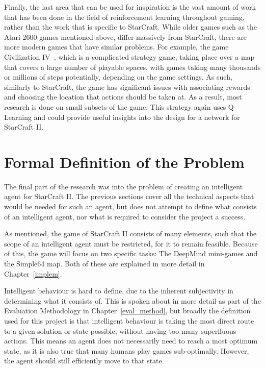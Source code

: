 Finally, the last area that can be used for inspiration is the vast amount of
work that has been done in the field of reinforcement learning throughout gaming,
rather than the work that is specific to StarCraft. While older games such as
the Atari 2600 games mentioned above, differ massively from StarCraft, there are
more modern games that have similar problems. For example, the game
Civilization IV~\cite{wender2008using}, which is a complicated strategy game,
taking place over a map that covers a large number of playable spaces, with
games taking many thousands or millions of steps potentially, depending on the
game settings. As such, similarly to StarCraft, the game has significant issues
with associating rewards and choosing the location that actions should be taken
at. As a result, most research is done on small subsets of the game. This
strategy again uses Q-Learning and could provide useful insights into the
design for a network for StarCraft II\@.


\section{Formal Definition of the Problem}

The final part of the research was into the problem of creating an intelligent
agent for StarCraft II\@. The previous sections cover all the technical aspects
that would be needed for such an agent, but does not attempt to define what
consists of an intelligent agent, nor what is required to consider the project a
success.

As mentioned, the game of StarCraft II consists of many elements, such that the
scope of an intelligent agent must be restricted, for it to remain feasible.
Because of this, the game will focus on two specific tasks: The DeepMind
mini-games and the Simple64 map. Both of these are explained in more detail in
Chapter~\ref{implem}.

Intelligent behaviour is hard to define, due to the inherent subjectivity in
determining what it consists of. This is spoken about in more detail as part of the
Evaluation Methodology in Chapter~\ref{eval_method}, but broadly the definition
used for this project is that intelligent behaviour is taking the most direct
route to a given solution or state possible, without having too many superfluous
actions. This means an agent does not necessarily need to reach a most optimum
state, as it is also true that many humans play games sub-optimally. However,
the agent should still efficiently move to that state.

